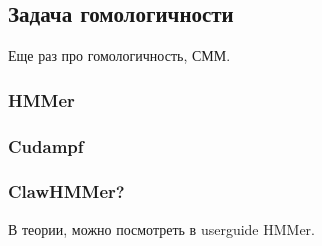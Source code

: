 \subsection{Задача гомологичности}
Еще раз про гомологичность, СММ.
\subsubsection{HMMer}
\subsubsection{Cudampf}
\subsubsection{ClawHMMer?}

В теории, можно посмотреть в userguide HMMer.
